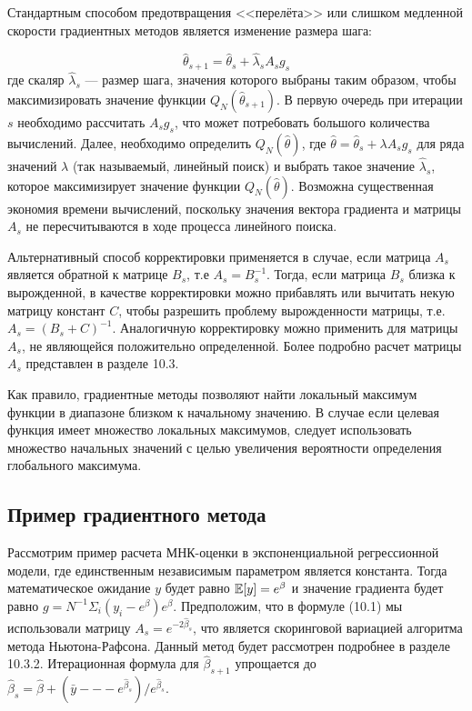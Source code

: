 Стандартным способом предотвращения <<перелёта>> или слишком медленной скорости  градиентных методов является изменение размера шага:

\begin{equation}
\hat{\theta}_{s+1}=\hat{\theta}_s+\hat{\lambda}_sA_sg_s
\end{equation}
где скаляр $\hat{\lambda}_s$ --- размер шага, значения которого выбраны таким образом, чтобы максимизировать значение функции $Q_N(\hat{\theta}_{s+1})$. В первую очередь при итерации $s$ необходимо рассчитать $A_s g_s$, что может потребовать большого количества вычислений. Далее, необходимо определить $Q_N(\hat{\theta})$, где $\hat{\theta} = \hat{\theta}_s + \lambda A_s g_s$ для ряда значений $\lambda$ (так называемый, линейный поиск) и выбрать такое значение $\hat{\lambda}_s$, которое максимизирует значение функции $Q_N(\hat{\theta})$. Возможна существенная экономия времени вычислений, поскольку значения вектора градиента и матрицы $A_s$ не пересчитываются в ходе процесса линейного поиска.

Альтернативный способ корректировки применяется в случае, если матрица $A_s$ является обратной к матрице $B_s$, т.е $A_s=B_s^{-1}$. Тогда, если матрица $B_s$ близка к вырожденной, в качестве корректировки можно прибавлять или вычитать некую матрицу констант $C$, чтобы разрешить проблему вырожденности матрицы, т.е. $A_s = ({B_s + C})^{-1}$. Аналогичную корректировку можно применить для  матрицы $A_s$, не являющейся положительно определенной. Более подробно расчет матрицы $A_s$ представлен в разделе 10.3.

Как правило, градиентные методы позволяют найти локальный максимум функции в диапазоне близком к начальному значению. В случае если целевая функция имеет множество локальных максимумов, следует использовать множество начальных значений с целью увеличения вероятности определения глобального максимума.

\subsection{Пример градиентного метода}

Рассмотрим пример расчета МНК-оценки в экспоненциальной регрессионной модели, где единственным независимым параметром является константа. Тогда математическое ожидание $y$ будет равно $\mathbb{E}[y]=e^{\beta}$ и значение градиента будет равно $g=N^{-1}\Sigma_{i}(y_i-e^\beta)e^{\beta}$. Предположим, что в формуле (10.1) мы использовали матрицу $A_s=e^{-2\hat{\beta}_s}$, что является скоринговой вариацией алгоритма метода Ньютона-Рафсона. Данный метод будет рассмотрен подробнее в разделе 10.3.2. Итерационная формула для $\hat{\beta}_{s+1}$ упрощается до $\hat{\beta}_s = \hat{\beta} + (\bar{y} --- e^{\hat{\beta}_s})/e^{\hat{\beta}_s}$. 

